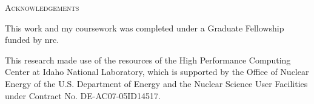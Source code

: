 \begin{center}
   {\LARGE\textsc{Acknowledgements}}

   This work and my coursework was completed under a Graduate Fellowship funded by \acf{nrc}.
   
   This research made use of the resources of the High Performance Computing Center at Idaho National Laboratory, which is supported by the Office of Nuclear Energy of the U.S. Department of Energy and the Nuclear Science User Facilities under Contract No. DE-AC07-05ID14517.
\end{center}

